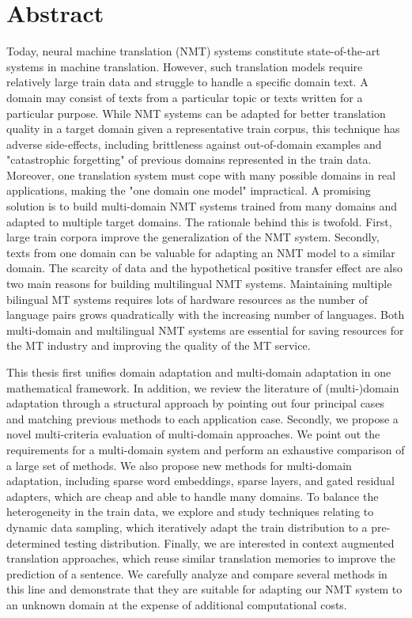 \chapter*{Abstract}
Today, neural machine translation (NMT) systems constitute state-of-the-art systems in machine translation. However, such translation models require relatively large train data and struggle to handle a specific domain text. A domain may consist of texts from a particular topic or texts written for a particular purpose. While NMT systems can be adapted for better translation quality in a target domain given a representative train corpus, this technique has adverse side-effects, including brittleness against out-of-domain examples and "catastrophic forgetting" of previous domains represented in the train data. Moreover, one translation system must cope with many possible domains in real applications, making the "one domain one model" impractical. A promising solution is to build multi-domain NMT systems trained from many domains and adapted to multiple target domains. The rationale behind this is twofold. First, large train corpora improve the generalization of the NMT system. Secondly, texts from one domain can be valuable for adapting an NMT model to a similar domain. The scarcity of data and the hypothetical positive transfer effect are also two main reasons for building multilingual NMT systems. Maintaining multiple bilingual MT systems requires lots of hardware resources as the number of language pairs grows quadratically with the increasing number of languages. Both multi-domain and multilingual NMT systems are essential for saving resources for the MT industry and improving the quality of the MT service.

This thesis first unifies domain adaptation and multi-domain adaptation in one mathematical framework. In addition, we review the literature of (multi-)domain adaptation through a structural approach by pointing out four principal cases and matching previous methods to each application case. Secondly, we propose a novel multi-criteria evaluation of multi-domain approaches. We point out the requirements for a multi-domain system and perform an exhaustive comparison of a large set of methods. We also propose new methods for multi-domain adaptation, including sparse word embeddings, sparse layers, and gated residual adapters, which are cheap and able to handle many domains. To balance the heterogeneity in the train data, we explore and study techniques relating to dynamic data sampling, which iteratively adapt the train distribution to a pre-determined testing distribution. Finally, we are interested in context augmented translation approaches, which reuse similar translation memories to improve the prediction of a sentence. We carefully analyze and compare several methods in this line and demonstrate that they are suitable for adapting our NMT system to an unknown domain at the expense of additional computational costs.


